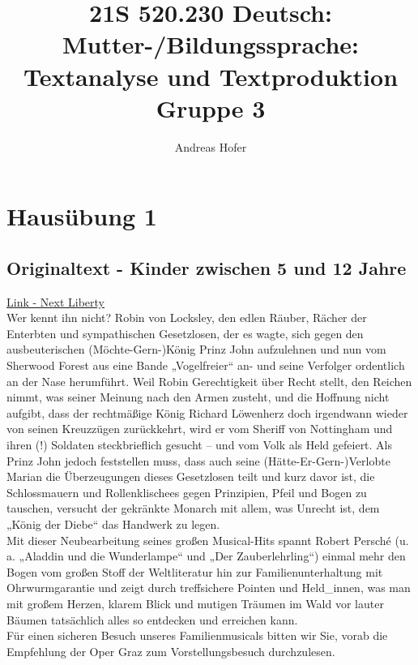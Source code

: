 \documentclass{article}
\title{21S 520.230 Deutsch: Mutter-/Bildungssprache: Textanalyse und Textproduktion Gruppe 3}
\author{Andreas Hofer}
\begin{document}
\section*{Hausübung 1}
\subsection*{Originaltext - Kinder zwischen 5 und 12 Jahre}
\href{https://nextliberty.buehnen-graz.com/stuecke/robin-hood/}{Link - Next Liberty} \\
Wer kennt ihn nicht? Robin von Locksley, den edlen Räuber, Rächer der Enterbten und sympathischen Gesetzlosen, der es wagte, sich gegen den ausbeuterischen (Möchte-Gern-)König Prinz John aufzulehnen und nun vom Sherwood Forest aus eine Bande „Vogelfreier“ an- und seine Verfolger ordentlich an der Nase herumführt. Weil Robin Gerechtigkeit über Recht stellt, den Reichen nimmt, was seiner Meinung nach den Armen zusteht, und die Hoffnung nicht aufgibt, dass der rechtmäßige König Richard Löwenherz doch irgendwann wieder von seinen Kreuzzügen zurückkehrt, wird er vom Sheriff von Nottingham und ihren (!) Soldaten steckbrieflich gesucht – und vom Volk als Held gefeiert. Als Prinz John jedoch feststellen muss, dass auch seine (Hätte-Er-Gern-)Verlobte Marian die Überzeugungen dieses Gesetzlosen teilt und kurz davor ist, die Schlossmauern und Rollenklischees gegen Prinzipien, Pfeil und Bogen zu tauschen, versucht der gekränkte Monarch mit allem, was Unrecht ist, dem „König der Diebe“ das Handwerk zu legen.\\

Mit dieser Neubearbeitung seines großen Musical-Hits spannt Robert Persché (u. a. „Aladdin und die Wunderlampe“ und „Der Zauberlehrling“) einmal mehr den Bogen vom großen Stoff der Weltliteratur hin zur Familienunterhaltung mit Ohrwurmgarantie und zeigt durch treffsichere Pointen und Held\_innen, was man mit großem Herzen, klarem Blick und mutigen Träumen im Wald vor lauter Bäumen tatsächlich alles so entdecken und erreichen kann.\\

Für einen sicheren Besuch unseres Familienmusicals bitten wir Sie, vorab die Empfehlung der Oper Graz zum Vorstellungsbesuch durchzulesen.
\end{document}

